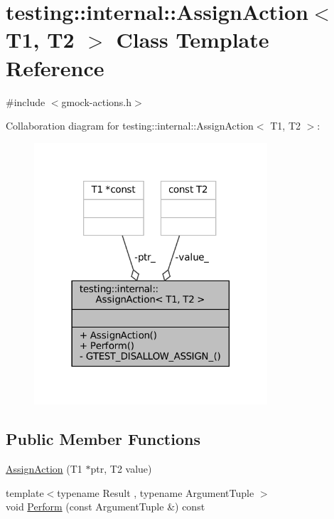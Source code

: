 \hypertarget{classtesting_1_1internal_1_1AssignAction}{}\section{testing\+:\+:internal\+:\+:Assign\+Action$<$ T1, T2 $>$ Class Template Reference}
\label{classtesting_1_1internal_1_1AssignAction}


{\ttfamily \#include $<$gmock-\/actions.\+h$>$}



Collaboration diagram for testing\+:\+:internal\+:\+:Assign\+Action$<$ T1, T2 $>$\+:
\nopagebreak
\begin{figure}[H]
\begin{center}
\leavevmode
\includegraphics[width=246pt]{classtesting_1_1internal_1_1AssignAction__coll__graph}
\end{center}
\end{figure}
\subsection*{Public Member Functions}
\begin{DoxyCompactItemize}
\item 
\hyperlink{classtesting_1_1internal_1_1AssignAction_ae5a8fe8954ff3f8b26a08b57c3afdf9a}{Assign\+Action} (T1 $\ast$ptr, T2 value)
\item 
{\footnotesize template$<$typename Result , typename Argument\+Tuple $>$ }\\void \hyperlink{classtesting_1_1internal_1_1AssignAction_a540912bec1f4de6fc4c7de26312e4586}{Perform} (const Argument\+Tuple \&) const
\end{DoxyCompactItemize}
